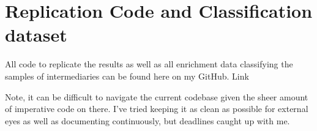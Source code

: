 \section{Replication Code and Classification dataset}

All code to replicate the results as well as all enrichment data classifying the samples of intermediaries can be found here on my GitHub. Link

Note, it can be difficult to navigate the current codebase given the sheer amount of imperative code on there. I've tried keeping it as clean as possible for external eyes as well as documenting continuously, but deadlines caught up with me.





